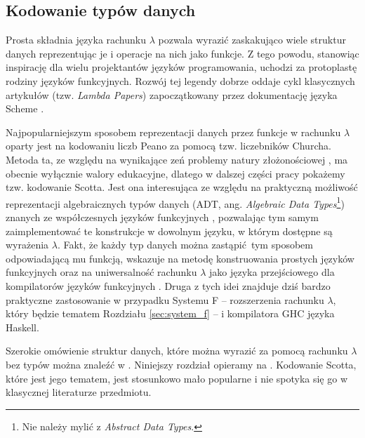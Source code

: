 \subsection{Kodowanie typów danych}\label{subsec:scott_encoding}

Prosta składnia języka rachunku \(\lambda\) pozwala wyrazić zaskakująco wiele struktur danych reprezentując je i operacje na nich jako funkcje. Z tego powodu, stanowiąc inspirację dla wielu projektantów języków programowania, uchodzi za protoplastę rodziny języków funkcyjnych. Rozwój tej legendy dobrze oddaje cykl klasycznych artykułów (tzw. \emph{Lambda Papers}) zapoczątkowany przez dokumentację języka Scheme \cite{Sussman:1975:IEL:889230}.

Najpopularniejszym sposobem reprezentacji danych przez funkcje w rachunku \(\lambda\) oparty jest na kodowaniu liczb Peano za pomocą tzw. liczebników Churcha. Metoda ta, ze względu na wynikające zeń problemy natury złożonościowej \cite{Koopman:2014:CED:2746325.2746330}, ma obecnie wyłącznie walory edukacyjne, dlatego w dalszej części pracy pokażemy tzw. kodowanie Scotta. Jest ona interesująca ze względu na praktyczną możliwość reprezentacji algebraicznych typów danych (ADT, ang. \emph{Algebraic Data Types}\footnote{Nie należy mylić z \emph{Abstract Data Types}.}) znanych ze współczesnych języków funkcyjnych \cite{Jansen:2013:P9C:2941698.2941710}, pozwalając tym samym zaimplementować te konstrukcje w dowolnym języku, w którym dostępne są wyrażenia \(\lambda\). Fakt, że każdy typ danych można zastąpić tym sposobem odpowiadającą mu funkcją, wskazuje na metodę konstruowania prostych języków funkcyjnych \cite{Jensen_2006} oraz na uniwersalność rachunku \(\lambda\) jako języka przejściowego dla kompilatorów języków funkcyjnych \cite[Rozdział 3]{PeytonJones:1992:IFL:129390}. Druga z tych idei znajduje dziś bardzo praktyczne zastosowanie w przypadku Systemu F -- rozszerzenia rachunku \(\lambda\), który będzie tematem Rozdziału \ref{sec:system_f} -- i kompilatora GHC języka Haskell.

Szerokie omówienie struktur danych, które można wyrazić za pomocą rachunku \(\lambda\) bez typów można znaleźć w \cite[Rozdział 3]{DBLP:journals/corr/abs-0804-3434}. Niniejszy rozdział opieramy na \cite{Jansen:2013:P9C:2941698.2941710}. Kodowanie Scotta, które jest jego tematem, jest stosunkowo mało popularne i nie spotyka się go w klasycznej literaturze przedmiotu.

